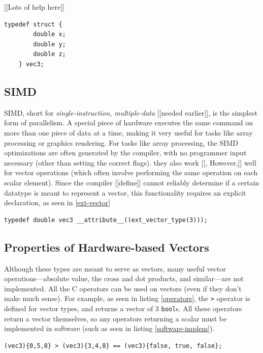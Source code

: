 \documentclass[12pt,twoside]{reedthesis}
\begin{document}
[[Lots of help here]]

\begin{lstlisting}[caption={A[[n ? ]] nearly-equivalent declaration\label{struct-vector}}]
    typedef struct {
        double x;
        double y;
        double z;
    } vec3;
\end{lstlisting}

\subsection{SIMD}
SIMD, short for \emph{single-instruction, multiple-data} [[needed earlier]], is the simplest form of parallelism. A special piece of hardware executes the same command on more than one piece of data at a time, making it very useful for tasks like array processing or graphics rendering. For tasks like array processing, the SIMD optimizations are often generated by the compiler, with no programmer input necessary (other than setting the correct flags). they also work [[, However,]]  well for vector operations (which often involve performing the same operation on each scalar element). Since the compiler [[define]] cannot reliably determine if a certain datatype is meant to represent a vector, this functionality requires an explicit declaration, as seen in \ref{ext-vector}

\begin{lstlisting}[caption={The declaration for EXT vector types\label{ext-vector}}]
    typedef double vec3 __attribute__((ext_vector_type(3)));
\end{lstlisting}



\subsection{Properties of Hardware-based Vectors}

Although these types are meant to serve as vectors, many useful vector operations---absolute value, the cross and dot products, and similar---are not implemented. All the C operators can be used on vectors (even if they don't make much sense). For example, as seen in listing \ref{operators}, the \texttt{>} operator is defined for vector types, and returns a vector of 3 \texttt{bool}s. All these operators return a vector themselves, so any operators returning a scalar must be implemented in software (such as seen in listing \ref{software-implem}).

\begin{lstlisting}[caption={Some operations aren't especially useful\label{operators}}]
    (vec3){0,5,8} > (vec3){3,4,8} == (vec3){false, true, false};
\end{lstlisting}
\end{document}
